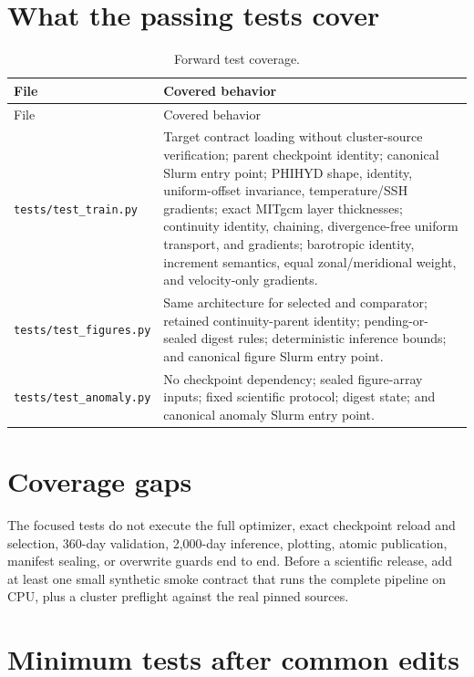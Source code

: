 \documentclass[11pt,oneside]{report}
\newcommand{\repo}[1]{\nolinkurl{#1}}
\begin{document}
\section{What the passing tests cover}

\begin{longtable}{@{}p{}p{}@{}}
\caption{Forward test coverage.}
\label{tab:tests}\\
\toprule
File & Covered behavior \\
\midrule
\endfirsthead
\toprule
File & Covered behavior \\
\midrule
\endhead
\repo{tests/test_train.py} &
Target contract loading without cluster-source verification; parent
checkpoint identity; canonical Slurm entry point; PHIHYD shape, identity,
uniform-offset invariance, temperature/SSH gradients; exact MITgcm layer
thicknesses; continuity identity, chaining, divergence-free uniform transport,
and gradients; barotropic identity, increment semantics, equal zonal/meridional
weight, and velocity-only gradients. \\
\repo{tests/test_figures.py} &
Same architecture for selected and comparator; retained continuity-parent
identity; pending-or-sealed digest rules; deterministic inference bounds; and
canonical figure Slurm entry point. \\
\repo{tests/test_anomaly.py} &
No checkpoint dependency; sealed figure-array inputs; fixed scientific
protocol; digest state; and canonical anomaly Slurm entry point. \\
\bottomrule
\end{longtable}

\section{Coverage gaps}

The focused tests do not execute the full optimizer, exact checkpoint reload
and selection, 360-day validation, 2,000-day inference, plotting, atomic
publication, manifest sealing, or overwrite guards end to end. Before a
scientific release, add at least one small synthetic smoke contract that runs
the complete pipeline on CPU, plus a cluster preflight against the real pinned
sources.

\section{Minimum tests after common edits}
\end{document}
